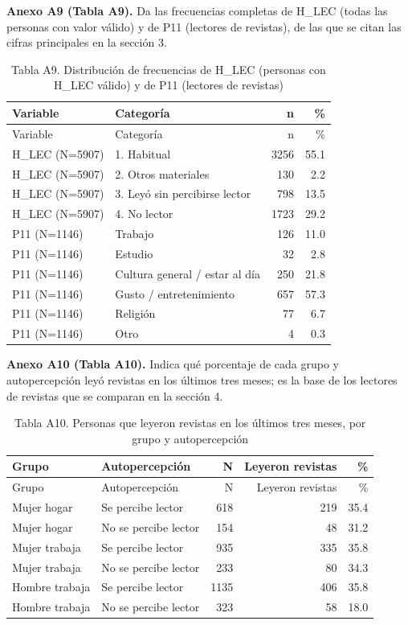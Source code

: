 \documentclass[
  spanish,
  12pt,
]{extarticle}
\begin{document}
\textbf{Anexo A9 (Tabla A9).} Da las frecuencias completas de H\_LEC
(todas las personas con valor válido) y de P11 (lectores de revistas),
de las que se citan las cifras principales en la sección 3.

\begin{longtable}[]{@{}llrr@{}}
\caption{Tabla A9. Distribución de frecuencias de H\_LEC (personas con
H\_LEC válido) y de P11 (lectores de revistas)}\tabularnewline
\toprule\noalign{}
Variable & Categoría & n & \% \\
\midrule\noalign{}
\endfirsthead
\toprule\noalign{}
Variable & Categoría & n & \% \\
\midrule\noalign{}
\endhead
\bottomrule\noalign{}
\endlastfoot
H\_LEC (N=5907) & 1. Habitual & 3256 & 55.1 \\
H\_LEC (N=5907) & 2. Otros materiales & 130 & 2.2 \\
H\_LEC (N=5907) & 3. Leyó sin percibirse lector & 798 & 13.5 \\
H\_LEC (N=5907) & 4. No lector & 1723 & 29.2 \\
P11 (N=1146) & Trabajo & 126 & 11.0 \\
P11 (N=1146) & Estudio & 32 & 2.8 \\
P11 (N=1146) & Cultura general / estar al día & 250 & 21.8 \\
P11 (N=1146) & Gusto / entretenimiento & 657 & 57.3 \\
P11 (N=1146) & Religión & 77 & 6.7 \\
P11 (N=1146) & Otro & 4 & 0.3 \\
\end{longtable}

\textbf{Anexo A10 (Tabla A10).} Indica qué porcentaje de cada grupo y
autopercepción leyó revistas en los últimos tres meses; es la base de
los lectores de revistas que se comparan en la sección 4.

\begin{longtable}[]{@{}llrrr@{}}
\caption{Tabla A10. Personas que leyeron revistas en los últimos tres
meses, por grupo y autopercepción}\tabularnewline
\toprule\noalign{}
Grupo & Autopercepción & N & Leyeron revistas & \% \\
\midrule\noalign{}
\endfirsthead
\toprule\noalign{}
Grupo & Autopercepción & N & Leyeron revistas & \% \\
\midrule\noalign{}
\endhead
\bottomrule\noalign{}
\endlastfoot
Mujer hogar & Se percibe lector & 618 & 219 & 35.4 \\
Mujer hogar & No se percibe lector & 154 & 48 & 31.2 \\
Mujer trabaja & Se percibe lector & 935 & 335 & 35.8 \\
Mujer trabaja & No se percibe lector & 233 & 80 & 34.3 \\
Hombre trabaja & Se percibe lector & 1135 & 406 & 35.8 \\
Hombre trabaja & No se percibe lector & 323 & 58 & 18.0 \\
\end{longtable}
\end{document}
